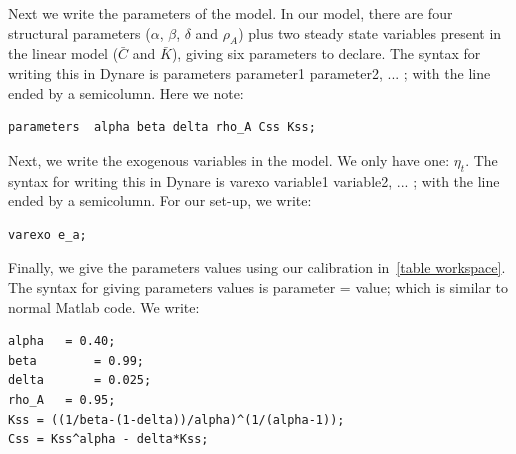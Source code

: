 \documentclass[a4paper,12pt]{article}%
\begin{document}
Next we write the parameters of the model. In our model, there are four
structural parameters ($\alpha$, $\beta$, $\delta$ and $\rho_{A}$) plus two
steady state variables present in the linear model ($\bar{C}$ and $\bar{K}$),
giving six parameters to declare. The syntax for writing this in Dynare is
\textsf{parameters parameter1 parameter2, ... ;} with the line ended by a
semicolumn. Here we note:%

\vspace{1ex}
\begin{verbatim}
parameters  alpha beta delta rho_A Css Kss;
\end{verbatim}
\vspace{1ex}%


Next, we write the exogenous variables in the model. We only have one:
$\eta_{t}$. The syntax for writing this in Dynare is\textsf{ varexo variable1
variable2, ... ;} with the line ended by a semicolumn. For our set-up, we write:%

\vspace{1ex}
\begin{verbatim}
varexo e_a;
\end{verbatim}
\vspace{1ex}%


Finally, we give the parameters values using our calibration
in\ \autoref{table workspace}. The syntax for giving parameters values is
\textsf{parameter = value;} which is similar to normal Matlab code. We write:%

\vspace{1ex}
\begin{verbatim}
alpha	= 0.40;		
beta    	= 0.99;		
delta    	= 0.025;		
rho_A	= 0.95;		
Kss	= ((1/beta-(1-delta))/alpha)^(1/(alpha-1));
Css	= Kss^alpha - delta*Kss;
\end{verbatim}
\vspace{1ex}%
\end{document}
